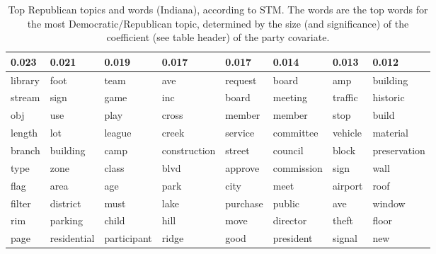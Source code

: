 \begin{table}[ht]
\centering
\begin{tabular}{llllllll}
  \hline
0.023 & 0.021 & 0.019 & 0.017 & 0.017 & 0.014 & 0.013 & 0.012 \\ 
  \hline
library & foot & team & ave & request & board & amp & building \\ 
  stream & sign & game & inc & board & meeting & traffic & historic \\ 
  obj & use & play & cross & member & member & stop & build \\ 
  length & lot & league & creek & service & committee & vehicle & material \\ 
  branch & building & camp & construction & street & council & block & preservation \\ 
  type & zone & class & blvd & approve & commission & sign & wall \\ 
  flag & area & age & park & city & meet & airport & roof \\ 
  filter & district & must & lake & purchase & public & ave & window \\ 
  rim & parking & child & hill & move & director & theft & floor \\ 
  page & residential & participant & ridge & good & president & signal & new \\ 
   \hline
\end{tabular}
\caption{Top Republican topics and words (Indiana), according to STM. 
The words are the top words for the most Democratic/Republican topic, determined
by the size (and significance) of the coefficient (see table header) of the party covariate.} 
\label{tabSTMINRep}
\end{table}

